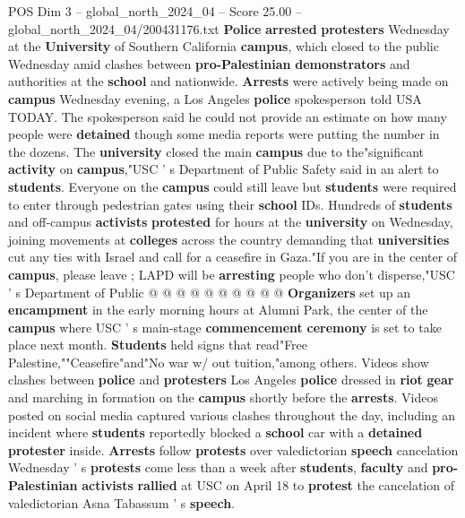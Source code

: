 \begin{textsample}{POS Dim 3 – global\_north\_2024\_04 – Score 25.00 – global\_north\_2024\_04/200431176.txt}  \label{ex:f3_pos_076}
\textbf{Police} \textbf{arrested} \textbf{protesters} Wednesday at the \textbf{University} of Southern California \textbf{campus}, which closed to the public Wednesday amid clashes between \textbf{pro-Palestinian} \textbf{demonstrators} and authorities at the \textbf{school} and nationwide. \textbf{Arrests} were actively being made on \textbf{campus} Wednesday evening, a Los Angeles \textbf{police} spokesperson told USA TODAY.
The spokesperson said he could not provide an estimate on how many people were \textbf{detained} though some media reports were putting the number in the dozens.
The \textbf{university} closed the main \textbf{campus} due to the"significant \textbf{activity} on \textbf{campus},"USC ' s Department of Public Safety said in an alert to \textbf{students}.
Everyone on the \textbf{campus} could still leave but \textbf{students} were required to enter through pedestrian gates using their \textbf{school} IDs.
Hundreds of \textbf{students} and off-campus \textbf{activists} \textbf{protested} for hours at the \textbf{university} on Wednesday, joining movements at \textbf{colleges} across the country demanding that \textbf{universities} cut any ties with Israel and call for a ceasefire in Gaza."If you are in the center of \textbf{campus}, please leave ; LAPD will be \textbf{arresting} people who don't disperse,"USC ' s Department of Public @ @ @ @ @ @ @ @ @ @ \textbf{Organizers} set up an \textbf{encampment} in the early morning hours at Alumni Park, the center of the \textbf{campus} where USC ' s main-stage \textbf{commencement} \textbf{ceremony} is set to take place next month. \textbf{Students} held signs that read"Free Palestine,""Ceasefire"and"No war w/ out tuition,"among others.
Videos show clashes between \textbf{police} and \textbf{protesters} Los Angeles \textbf{police} dressed in \textbf{riot} \textbf{gear} and marching in formation on the \textbf{campus} shortly before the \textbf{arrests}.
Videos posted on social media captured various clashes throughout the day, including an incident where \textbf{students} reportedly blocked a \textbf{school} car with a \textbf{detained} \textbf{protester} inside. \textbf{Arrests} follow \textbf{protests} over valedictorian \textbf{speech} cancelation Wednesday ' s \textbf{protests} come less than a week after \textbf{students}, \textbf{faculty} and \textbf{pro-Palestinian} \textbf{activists} \textbf{rallied} at USC on April 18 to \textbf{protest} the cancelation of valedictorian Asna Tabassum ' s \textbf{speech}.

\end{textsample}
